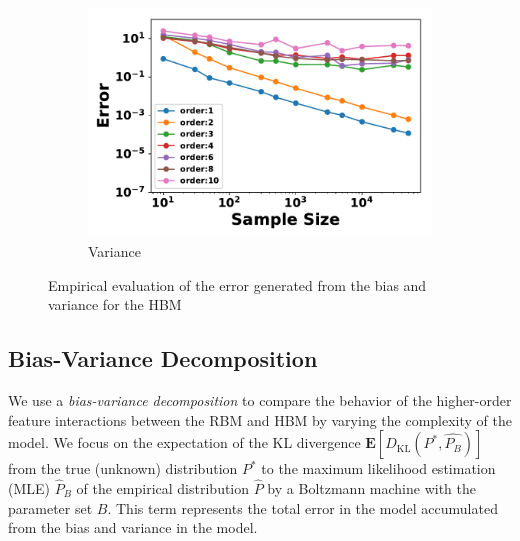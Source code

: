 \documentclass[letterpaper]{article} %
\begin{document}
\begin{figure}[t]
\begin{subfigure}[b]{0.33\textwidth}
              \includegraphics[width=\textwidth]{./HBM_Variance_Selected-eps-converted-to.pdf}
              \caption{Variance}
          \end{subfigure}
          \caption{Empirical evaluation of the error generated from the bias and variance for the HBM} \label{fig:HBM_error_plot}
        \end{figure}

	\subsection{Bias-Variance Decomposition}
		We use a \textit{bias-variance decomposition} to compare the behavior of the higher-order feature interactions between the RBM and HBM by varying the complexity of the model. We focus on the expectation of the KL divergence $\mathbf{E} [ D_{\mathrm{KL}} ( P^{*}, \hat{P_B} )]$ from the true (unknown) distribution $P^*$ to the maximum likelihood estimation (MLE) $\hat{P}_B$ of the empirical distribution $\hat{P}$ by a Boltzmann machine with the parameter set $B$. This term represents the total error in the model accumulated from the bias and variance in the model.
\end{document}
